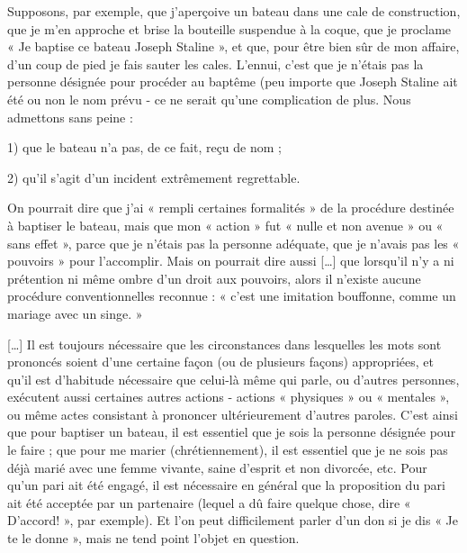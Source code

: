 \begin{lecture}{}
Supposons, par exemple, que j’aperçoive un bateau dans une cale de construction, que je m’en approche et brise la bouteille suspendue à la coque, que je proclame « Je baptise ce bateau Joseph Staline », et que, pour être bien sûr de mon affaire, d’un coup de pied je fais sauter les cales. L’ennui, c’est que je n’étais pas la personne désignée pour procéder au baptême (peu importe que Joseph Staline ait été ou non le nom prévu - ce ne serait qu’une complication de plus. Nous admettons sans peine :

1) que le bateau n’a pas, de ce fait, reçu de nom ;

2) qu’il s’agit d’un incident extrêmement regrettable.

On pourrait dire que j’ai « rempli certaines formalités » de la procédure destinée à baptiser le bateau, mais que mon « action » fut « nulle et non avenue » ou « sans effet », parce que je n’étais pas la personne adéquate, que je n’avais pas les « pouvoirs » pour l’accomplir. Mais on pourrait dire aussi […] que lorsqu’il n’y a ni prétention ni même ombre d’un droit aux pouvoirs, alors il n’existe aucune procédure conventionnelles reconnue : « c’est une imitation bouffonne, comme un mariage avec un singe. »

[…] Il est toujours nécessaire que les circonstances dans lesquelles les mots sont prononcés soient d’une certaine façon (ou de plusieurs façons) appropriées, et qu’il est d’habitude nécessaire que celui-là même qui parle, ou d’autres personnes, exécutent aussi certaines autres actions - actions « physiques » ou « mentales », ou même actes consistant à prononcer ultérieurement d’autres paroles. C’est ainsi que pour baptiser un bateau, il est essentiel que je sois la personne désignée pour le faire ; que pour me marier (chrétiennement), il est essentiel que je ne sois pas déjà marié avec une femme vivante, saine d’esprit et non divorcée, etc. Pour qu’un pari ait été engagé, il est nécessaire en général que la proposition du pari ait été acceptée par un partenaire (lequel a dû faire quelque chose, dire « D’accord! », par exemple). Et l’on peut difficilement parler d’un don si je dis « Je te le donne », mais ne tend point l’objet en question.
\end{lecture}

